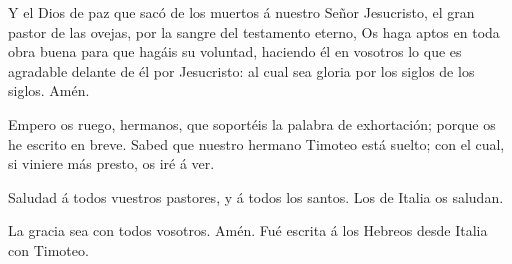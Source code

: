  Y el Dios de paz que sacó de los muertos á nuestro Señor
Jesucristo, el gran pastor de las ovejas, por la sangre del testamento
eterno,  Os haga aptos en toda obra buena para que hagáis
su voluntad, haciendo él en vosotros lo que es agradable delante de él
por Jesucristo: al cual sea gloria por los siglos de los siglos. Amén.

 Empero os ruego, hermanos, que soportéis la palabra de
exhortación; porque os he escrito en breve.  Sabed que
nuestro hermano Timoteo está suelto; con el cual, si viniere más presto,
os iré á ver.

 Saludad á todos vuestros pastores, y á todos los santos.
Los de Italia os saludan.

 La gracia sea con todos vosotros. Amén. Fué escrita á los
Hebreos desde Italia con Timoteo.
